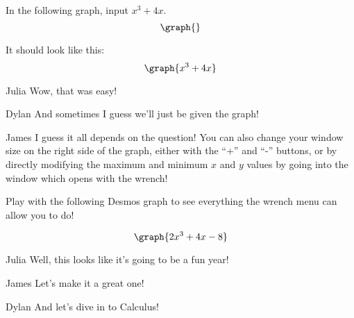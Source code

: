 \documentclass{ximera}
\begin{document}
In the following graph, input $x^3+4x$.
\[
\graph{}
\]

It should look like this:
\[
\graph{x^3+4x}
\]

\begin{dialogue}
\item[Julia] Wow, that was easy!
\item[Dylan] And sometimes I guess we'll just be given the graph!
\item[James] I guess it all depends on the question! You can also change your window size on the right side of the graph, either with the ``+'' and ``-'' buttons, or by directly modifying the maximum and minimum $x$ and $y$ values by going into the window which opens with the wrench!
\end{dialogue}

Play with the following Desmos graph to see everything the wrench menu can allow you to do!

\[
\graph{2x^3+4x-8}
\]

\begin{dialogue}
\item[Julia] Well, this looks like it's going to be a fun year!
\item[James] Let's make it a great one!
\item[Dylan] And let's dive in to Calculus!
\end{dialogue}
\end{document}
